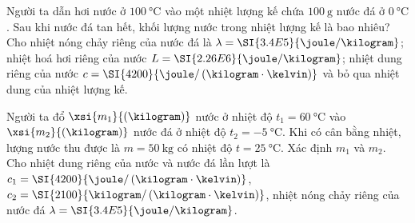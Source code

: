 \begin{ex}
	Người ta dẫn hơi nước ở $\SI{100}{\celsius}$ vào một nhiệt lượng kế chứa $\SI{100}{\gram}$ nước đá ở $\SI{0}{\celsius}$. Sau khi nước đá tan hết, khối lượng nước trong nhiệt lượng kế là bao nhiêu? Cho nhiệt nóng chảy riêng của nước đá là $\lambda=\SI{3.4E5}{\joule/\kilogram}$; nhiệt hoá hơi riêng của nước $L=\SI{2.26E6}{\joule/\kilogram}$; nhiệt dung riêng của nước $c=\SI{4200}{\joule/\left(\kilogram\cdot\kelvin\right)}$ và bỏ qua nhiệt dung của nhiệt lượng kế.
\end{ex}
\begin{ex}
		Người ta đổ $\xsi{m_1}{\left(\kilogram\right)}$ nước ở nhiệt độ $t_1=\SI{60}{\celsius}$ vào $\xsi{m_2}{\left(\kilogram\right)}$ nước đá ở nhiệt độ $t_2=\SI{-5}{\celsius}$. Khi có cân bằng nhiệt, lượng nước thu được là $m=\SI{50}{\kilogram}$ có nhiệt độ $t=\SI{25}{\celsius}$. Xác định $m_1$ và $m_2$. Cho nhiệt dung riêng của nước và nước đá lần lượt là $c_1=\SI{4200}{\joule/\left(\kilogram\cdot\kelvin\right)}$, $c_2=\SI{2100}{\kilogram/\left(\kilogram\cdot\kelvin\right)}$, nhiệt nóng chảy riêng của nước đá $\lambda=\SI{3.4E5}{\joule/\kilogram}$.
\end{ex}
